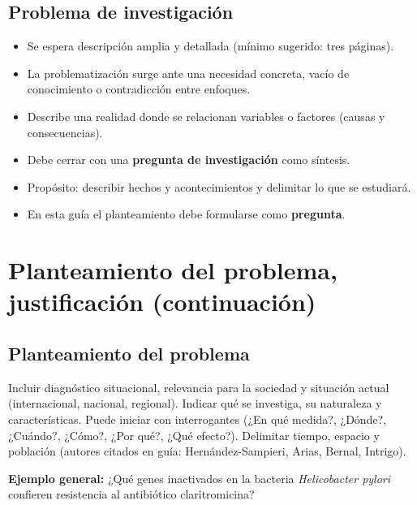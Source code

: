 \documentclass[a4paper,11pt]{book}
\begin{document}
\section{Problema de investigación}
\begin{itemize}[leftmargin=*]
  \item Se espera descripción amplia y detallada (mínimo sugerido: tres páginas).
  \item La problematización surge ante una necesidad concreta, vacío de conocimiento o contradicción entre enfoques.
  \item Describe una realidad donde se relacionan variables o factores (causas y consecuencias).
  \item Debe cerrar con una \textbf{pregunta de investigación} como síntesis.
  \item Propósito: describir hechos y acontecimientos y delimitar lo que se estudiará.
  \item En esta guía el planteamiento debe formularse como \textbf{pregunta}.
\end{itemize}

\chapter{Planteamiento del problema, justificación (continuación)}
\label{cap:planteamiento}

\section{Planteamiento del problema}
Incluir diagnóstico situacional, relevancia para la sociedad y situación actual (internacional, nacional, regional). Indicar qué se investiga, su naturaleza y características. Puede iniciar con interrogantes (¿En qué medida?, ¿Dónde?, ¿Cuándo?, ¿Cómo?, ¿Por qué?, ¿Qué efecto?). Delimitar tiempo, espacio y población (autores citados en guía: Hernández-Sampieri, Arias, Bernal, Intrigo).

\textbf{Ejemplo general:} ¿Qué genes inactivados en la bacteria \textit{Helicobacter pylori} confieren resistencia al antibiótico claritromicina?
\end{document}
